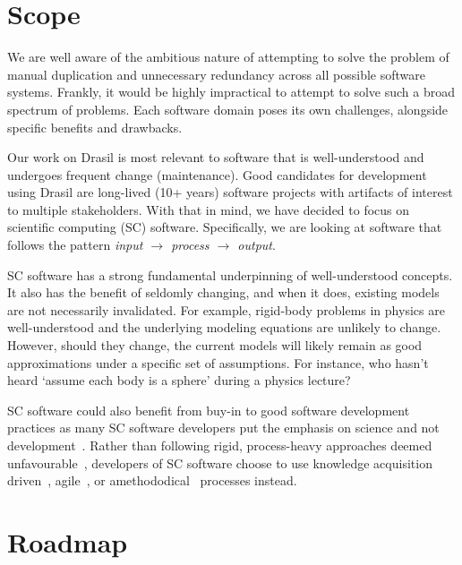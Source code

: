\section{Scope}
\label{sec:scope}
We are well aware of the ambitious nature of attempting to solve the problem of
manual duplication and unnecessary redundancy across all possible software
systems. Frankly, it would be highly impractical to attempt to solve such a
broad spectrum of problems. Each software domain poses its own challenges,
alongside specific benefits and drawbacks. 

Our work on Drasil is most relevant to software that is well-understood and 
undergoes frequent change (maintenance). Good candidates for development using
Drasil are long-lived (10+ years) software projects with artifacts of interest
to multiple stakeholders. With that in mind, we have decided to focus on
scientific computing (SC) software. Specifically, we are looking at software 
that follows the pattern \emph{input $\rightarrow$ process $\rightarrow$ 
output}.

SC software has a strong fundamental underpinning of well-understood concepts.
It also has the benefit of seldomly changing, and when it does, existing models
are not necessarily invalidated. For example, rigid-body problems in physics are
well-understood and the underlying modeling equations are unlikely to change.
However, should they change, the current models will likely remain as good
approximations under a specific set of assumptions. For instance, who hasn't
heard `assume each body is a sphere' during a physics lecture?

SC software could also benefit from buy-in to good software development 
practices as many SC software developers put the emphasis on science and not 
development~\citep{Kelly2007}. Rather than following rigid, process-heavy 
approaches deemed unfavourable~\citep{CarverEtAl2007}, developers of SC 
software choose to use knowledge acquisition driven~\citep{Kelly2015}, 
agile~\citep{Segal2005, CarverEtAl2007, AckroydEtAl2008, 
EasterbrookAndJohns2009}, or amethododical~\citep{Kelly2013} processes instead.

\section{Roadmap}

